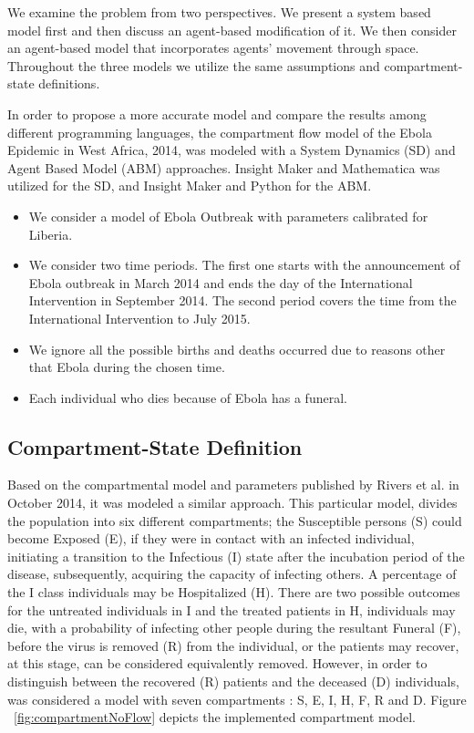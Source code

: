 We examine the problem from two perspectives. We present a system based model first and then discuss an agent-based modification of it. We then consider an agent-based model that incorporates agents' movement through space. Throughout the three models we utilize the same assumptions and compartment-state definitions. 

In order to propose a more accurate model and compare the results among different programming  languages, the compartment flow model of the Ebola Epidemic in West Africa, 2014, was modeled with a System Dynamics (SD) and Agent Based Model (ABM) approaches.  Insight Maker and Mathematica was utilized  for the SD, and Insight Maker and Python for the ABM.\\

\begin{itemize}
\item We consider a model of Ebola Outbreak with parameters calibrated for Liberia.
\item We consider two time periods. The first one starts with the announcement of Ebola outbreak in March 2014 and ends the day of the International Intervention in September 2014. The second period covers the time from the International Intervention to July 2015.
\item We ignore all the possible births and deaths occurred due to reasons other that Ebola during the chosen time. 
\item Each individual who dies because of Ebola has a funeral.
\end{itemize}



\subsection{Compartment-State Definition}
Based on the compartmental model and parameters published by Rivers et al.\cite{Rivers2014} in October 2014, it was modeled a similar approach.  This particular model, divides the population into six different compartments; the Susceptible persons (S) could become Exposed (E), if they were in contact with an infected individual, initiating a transition to the Infectious (I) state after the incubation period of the disease, subsequently, acquiring the capacity of infecting others. A percentage of the I class individuals may be Hospitalized (H). There are two possible outcomes for the untreated individuals in I and the treated patients in H, individuals may die, with a probability of infecting other people during the resultant Funeral (F), before the virus is removed (R) from the individual, or the patients may recover, at this stage, can be considered equivalently removed. However,  in order to distinguish between the recovered (R) patients and the deceased (D) individuals, was considered a model with seven compartments : S, E, I, H, F, R and D. Figure ~\ref{fig:compartmentNoFlow} depicts the implemented compartment model. \\


